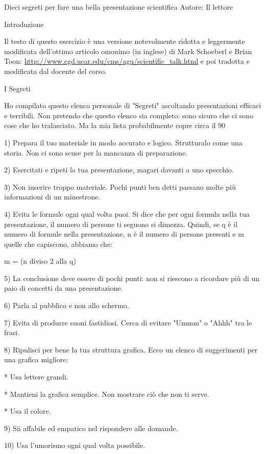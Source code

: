 \documentclass[12pt]{article}
\begin{document}
Dieci segreti per fare una bella presentazione scientifica
Autore: Il lettore


Introduzione

Il testo di questo esercizio è una versione notevolmente ridotta e leggermente modificata dell'ottimo articolo omonimo (in inglese) di Mark Schoeberl e Brian Toon:
\url{http://www.cgd.ucar.edu/cms/agu/scientific_talk.html} e poi tradotta e modificata dal docente del corso.

I Segreti

Ho compilato questo elenco personale di "Segreti" ascoltando presentazioni efficaci e terribili. Non pretendo che questo elenco sia completo: sono sicuro che ci sono cose che ho tralasciato. Ma la mia lista probabilmente copre circa il 90%

1) Prepara il tuo materiale in modo accurato e logico. Strutturalo come una storia. Non ci sono scuse per la mancanza di preparazione.

2) Esercitati e ripeti la tua presentazione, magari davanti a uno specchio. 

3) Non inserire troppo materiale. Pochi punti ben detti passano molte più informazioni di un minestrone.

4) Evita le formule ogni qual volta puoi. Si dice che per ogni formula nella tua presentazione, il numero di persone ti seguono si dimezza. Quindi, se q è il numero di formule nella presentazione, n è il numero di persone presenti e m quelle che capiscono, abbiamo che:

m = (n diviso 2 alla q)


5) La conclusione deve essere di pochi punti: non si riescono a ricordare più di un paio di concetti da una presentazione.

6) Parla al pubblico e non allo schermo.

7) Evita di produrre suoni fastidiosi. Cerca di evitare "Ummm" o "Ahhh" tra le frasi.

8) Ripulisci per bene la tua struttura grafica. Ecco un elenco di suggerimenti per una grafica migliore:

* Usa lettere grandi.

* Mantieni la grafica semplice. Non mostrare ciò che non ti serve.

* Usa il colore.

9) Sii affabile ed empatico nel rispondere alle domande.

10) Usa l'umorismo ogni qual volta possibile. 
\end{document}
